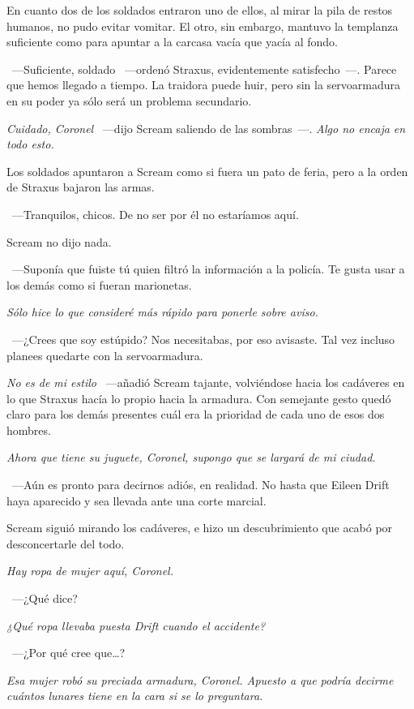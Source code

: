 En cuanto dos de los soldados entraron uno de ellos, al mirar la pila de restos humanos, no pudo evitar vomitar. El otro, sin embargo, mantuvo la templanza suficiente como para apuntar a la carcasa vacía que yacía al fondo.

~---Suficiente, soldado ~---ordenó Straxus, evidentemente satisfecho~---. Parece que hemos llegado a tiempo. La traidora puede huir, pero sin la servoarmadura en su poder ya sólo será un problema secundario.

\emph{Cuidado, Coronel} ~---dijo Scream saliendo de las sombras~---. \emph{Algo no encaja en todo esto.}

Los soldados apuntaron a Scream como si fuera un pato de feria, pero a la orden de Straxus bajaron las armas.

~---Tranquilos, chicos. De no ser por él no estaríamos aquí.

Scream no dijo nada.

~---Suponía que fuiste tú quien filtró la información a la policía. Te gusta usar a los demás como si fueran marionetas.

\emph{Sólo hice lo que consideré más rápido para ponerle sobre aviso.}

~---¿Crees que soy estúpido? Nos necesitabas, por eso avisaste. Tal vez incluso planees quedarte con la servoarmadura.

\emph{No es de mi estilo} ~---añadió Scream tajante, volviéndose hacia los cadáveres en lo que Straxus hacía lo propio hacia la armadura. Con semejante gesto quedó claro para los demás presentes cuál era la prioridad de cada uno de esos dos hombres.

\emph{Ahora que tiene su juguete, Coronel, supongo que se largará de mi ciudad.}

~---Aún es pronto para decirnos adiós, en realidad. No hasta que Eileen Drift haya aparecido y sea llevada ante una corte marcial.

Scream siguió mirando los cadáveres, e hizo un descubrimiento que acabó por desconcertarle del todo.

\emph{Hay ropa de mujer aquí, Coronel.}

~---¿Qué dice?

\emph{¿Qué ropa llevaba puesta Drift cuando el accidente?}

~---¿Por qué cree que\dots?

\emph{Esa mujer robó su preciada armadura, Coronel. Apuesto a que podría decirme cuántos lunares tiene en la cara si se lo preguntara.}

